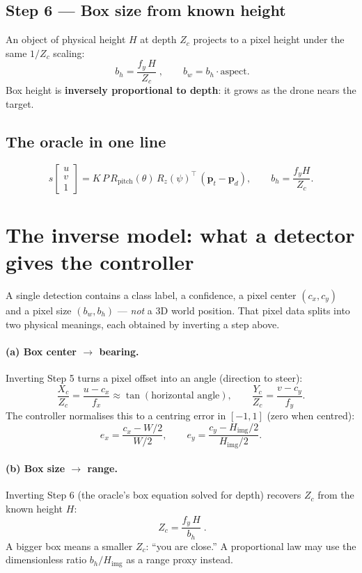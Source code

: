 \documentclass[11pt]{article}
\newcommand{\pd}{\bm{p}_d}
\newcommand{\pt}{\bm{p}_t}
\begin{document}
\subsection*{Step 6 — Box size from known height}
An object of physical height $H$ at depth $Z_c$ projects to a pixel height under
the same $1/Z_c$ scaling:
\[
\boxed{\;b_h = \frac{f_y\,H}{Z_c}\;},\qquad b_w = b_h \cdot \text{aspect}.
\]
Box height is \textbf{inversely proportional to depth}: it grows as the drone
nears the target.

\subsection*{The oracle in one line}
\[
s\begin{bmatrix} u \\ v \\ 1 \end{bmatrix}
= K\,P\,R_{\text{pitch}}(\theta)\,R_z(\psi)^\top\,(\pt - \pd),
\qquad b_h = \frac{f_y H}{Z_c}.
\]

\section{The inverse model: what a detector gives the controller}

A single detection contains a class label, a confidence, a pixel center
$(c_x,c_y)$ and a pixel size $(b_w,b_h)$ --- \emph{not} a 3D world position. That
pixel data splits into two physical meanings, each obtained by inverting a step
above.

\paragraph{(a) Box center $\to$ bearing.}
Inverting Step 5 turns a pixel offset into an angle (direction to steer):
\[
\frac{X_c}{Z_c} = \frac{u - c_x}{f_x} \approx \tan(\text{horizontal angle}),
\qquad
\frac{Y_c}{Z_c} = \frac{v - c_y}{f_y}.
\]
The controller normalises this to a centring error in $[-1,1]$ (zero when
centred):
\[
e_x = \frac{c_x - W/2}{W/2},\qquad e_y = \frac{c_y - H_{\text{img}}/2}{H_{\text{img}}/2}.
\]

\paragraph{(b) Box size $\to$ range.}
Inverting Step 6 (the oracle's box equation solved for depth) recovers $Z_c$ from
the known height $H$:
\[
\boxed{\;Z_c = \frac{f_y\,H}{b_h}\;}.
\]
A bigger box means a smaller $Z_c$: ``you are close.'' A proportional law may use
the dimensionless ratio $b_h/H_{\text{img}}$ as a range proxy instead.
\end{document}
